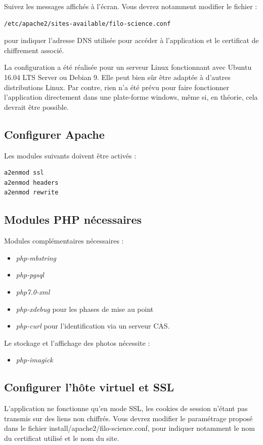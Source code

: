 Suivez les messages affichés à l'écran. Vous devrez notamment modifier le fichier :
\begin{lstlisting}
/etc/apache2/sites-available/filo-science.conf 
\end{lstlisting}
pour indiquer l'adresse DNS utilisée pour accéder à l'application et le certificat de chiffrement associé.

La configuration a été réalisée pour un serveur Linux fonctionnant avec Ubuntu 16.04 LTS Server ou Debian 9. Elle peut bien sûr être adaptée à d'autres distributions Linux. Par contre, rien n'a été prévu pour faire fonctionner l'application directement dans une plate-forme windows, même si, en théorie, cela devrait être possible.

\subsection{Configurer Apache}
Les modules suivants doivent être activés :
\begin{lstlisting}
a2enmod ssl
a2enmod headers
a2enmod rewrite
\end{lstlisting}
\subsection{Modules PHP nécessaires}
Modules complémentaires nécessaires :
\begin{itemize}
\item \textit{php-mbstring}
\item \textit{php-pgsql}
\item \textit{php7.0-xml} 
\item \textit{php-xdebug} pour les phases de mise au point
\item \textit{php-curl} pour l'identification via un serveur CAS.
\end{itemize}

Le stockage et l'affichage des photos nécessite :
\begin{itemize}
\item \textit{php-imagick}
\end{itemize}


\subsection{Configurer l'hôte virtuel et SSL}
L'application ne fonctionne qu'en mode SSL, les cookies de session n'étant pas transmis sur des liens non chiffrés. Vous devrez modifier le paramétrage proposé dans le fichier install/apache2/filo-science.conf, pour indiquer notamment le nom du certificat utilisé et le nom du site.

